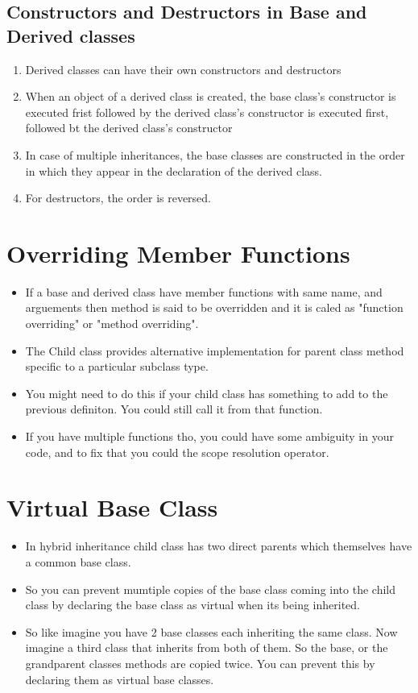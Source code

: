 \documentclass[11pt]{article}
\begin{document}
\subsection{Constructors and Destructors in Base and Derived classes}
\begin{enumerate}
	\item Derived classes can have their own constructors and destructors
	\item When an object of a derived class is created, the base class's constructor is executed frist followed by the derived class's constructor is executed first, followed bt the derived class's constructor
	\item In case of multiple inheritances, the base classes are constructed in the order in which they appear in the declaration of the derived class. 
	\item For destructors, the order is reversed. 
\end{enumerate}

\section{Overriding Member Functions}
\begin{itemize}
\item If a base and derived class have member functions with same name, and arguements then method is said to be overridden and it is caled as "function overriding" or "method overriding". 
\item The Child class provides alternative implementation for parent class method  specific to a particular subclass type. 
\item You might need to do this if your child class has something to add to the previous definiton. You could still call it from that function. 
\item If you have multiple functions tho, you could have some ambiguity in your code, and to fix that you could the scope resolution operator.
\end{itemize}




\section{Virtual Base Class}
\begin{itemize}
\item In hybrid inheritance child class has two direct parents which themselves have a common base class. 
\item So you can prevent mumtiple copies of the base class coming into the child class by declaring the base class as virtual when its being inherited. 
\item So like imagine you have 2 base classes each inheriting the same class. Now imagine a third class that inherits from both of them. So the base, or the grandparent classes methods are copied twice. You can prevent this by declaring them as virtual base classes. 
\end{itemize}
\end{document}
